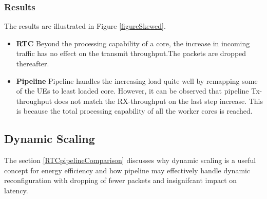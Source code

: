 \subsubsection{Results}
The results are illustrated in Figure \ref{figureSkewed}.
\begin{itemize}
    \item \textbf{RTC} Beyond the processing capability of a core, the increase in incoming traffic has no effect on the transmit throughput.The packets are dropped thereafter.
    \item \textbf{Pipeline} Pipeline handles the increasing load quite well by remapping
     some of the UEs to least loaded core. However,  it can be observed that pipeline
      Tx-throughput does not match the RX-throughput on the last step increase. This is because the total processing capability of all the worker cores is reached. 
\end{itemize}

\subsection{Dynamic Scaling \label{subsubsectionDynamicScaling}}
The section \ref{RTCpipelineComparison} discusses why dynamic scaling is a useful concept 
for energy efficiency and how pipeline may effectively handle dynamic reconfiguration with
 dropping of fewer packets and insignifcant impact on latency.

